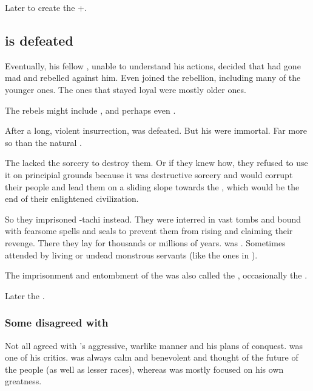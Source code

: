 Later  to create the +.









\subsection{\Sethicus is defeated}
Eventually, his fellow \ophidians, unable to understand his actions, decided that \Sethicus had gone mad and rebelled against him. 
Even \dragons joined the rebellion, including many of the younger ones. 
The ones that stayed loyal were mostly older ones. 

The rebels might include \Iurzmacul, \Nexagglachel and perhaps even \Ishnaruchaefir. 

After a long, violent insurrection, \Sethicus was defeated.
But his \dragons were immortal.
Far more so than the natural \ophidians.

The \ophidians lacked the sorcery to destroy them. 
Or if they knew how, they refused to use it on principial grounds because it was destructive sorcery and would corrupt their people and lead them on a sliding slope towards the \xs, which would be the end of their enlightened civilization.

So they imprisoned \Sethicus-tachi instead.
They were interred in vast tombs and bound with fearsome spells and seals to prevent them from rising and claiming their revenge.
There they lay for thousands or millions of years.
\Nexagglachel was . 
Sometimes attended by living or undead monstrous servants (like the ones in \Nithdornazsh).

The imprisonment and entombment of the \dragons was also called the , occasionally the .

Later the \dragons {}. 





\subsubsection{Some \dragons disagreed with \Sethicus}
Not all \dragons agreed with \Sethicus's aggressive, warlike manner and his plans of conquest. 
\Nexagglachel was one of his critics.
\Nexagglachel was always calm and benevolent and thought of the future of the people (\ophidians as well as lesser races), whereas \Sethicus was mostly focused on his own greatness. 

